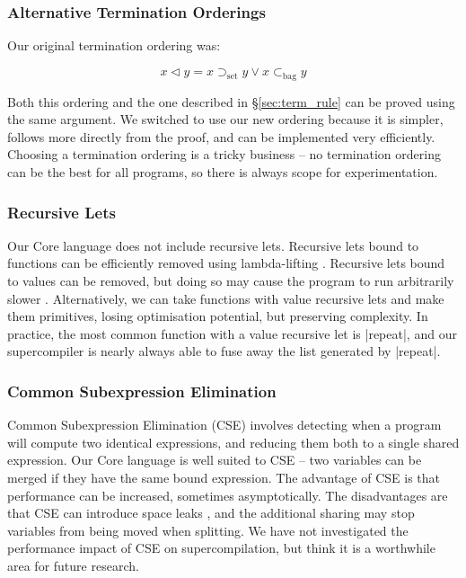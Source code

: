 \documentclass[draft]{sigplanconf}
\newcommand{\setsup}{\supset_{\mathrm{set}}}
\newcommand{\bagsub}{\subset_{\mathrm{bag}}}
\begin{document}
\subsubsection{Alternative Termination Orderings}

Our original termination ordering was:

\vspace{-\bigskipamount}

\[
x \lhd y = x \setsup y \vee x \bagsub y
\]

Both this ordering and the one described in \S\ref{sec:term_rule} can be proved using the same argument. We switched to use our new ordering because it is simpler, follows more directly from the proof, and can be implemented very efficiently. Choosing a termination ordering is a tricky business -- no termination ordering can be the best for all programs, so there is always scope for experimentation.

\subsubsection{Recursive Lets}

Our Core language does not include recursive lets. Recursive lets bound to functions can be efficiently removed using lambda-lifting \cite{lambda_lift}. Recursive lets bound to values can be removed, but doing so may cause the program to run arbitrarily slower \cite{me:thesis}. Alternatively, we can take functions with value recursive lets and make them primitives, losing optimisation potential, but preserving complexity. In practice, the most common function with a value recursive let is |repeat|, and our supercompiler is nearly always able to fuse away the list generated by |repeat|.

\subsubsection{Common Subexpression Elimination}

Common Subexpression Elimination (CSE) involves detecting when a program will compute two identical expressions, and reducing them both to a single shared expression. Our Core language is well suited to CSE -- two variables can be merged if they have the same bound expression. The advantage of CSE is that performance can be increased, sometimes asymptotically. The disadvantages are that CSE can introduce space leaks \cite{chitil:cse}, and the additional sharing may stop variables from being moved when splitting. We have not investigated the performance impact of CSE on supercompilation, but think it is a worthwhile area for future research.
\end{document}
